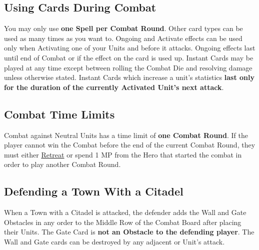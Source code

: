 \begin{multicols}{2}
\subsection*{\hypertarget{CombatCards}{Using Cards During Combat}}
You may only use \textbf{one Spell per Combat Round}.
Other card types can be used as many times as you want to.
Ongoing  and  Activate effects can be used only when Activating one of your Units and before it attacks.
Ongoing effects last until end of Combat or if the effect on the card is used up.
Instant  Cards may be played at any time except between rolling the Combat Die and resolving damage unless otherwise stated.
Instant Cards which increase a unit's statistics \textbf{last only for the duration of the currently Activated Unit's next attack}.
\subsection*{\hypertarget{Timelimit}{Combat Time Limits}}
Combat against Neutral Units has a time limit of \textbf{one Combat Round}.
If the player cannot win the Combat before the end of the current Combat Round, they must either \hyperlink{Endcombat}{Retreat} or spend 1 MP from the Hero that started the combat in order to play another Combat Round.\par
{}

\subsection*{\hypertarget{Walls}{Defending a Town With a Citadel}}

When a Town with a Citadel is attacked, the defender adds the Wall and Gate Obstacles in any order to the Middle Row of the Combat Board after placing their Units.
The Gate Card is \textbf{not an Obstacle to the defending player}.
The Wall and Gate cards can be destroyed by any adjacent  or  Unit's attack.\par
{}\par


\end{multicols}
